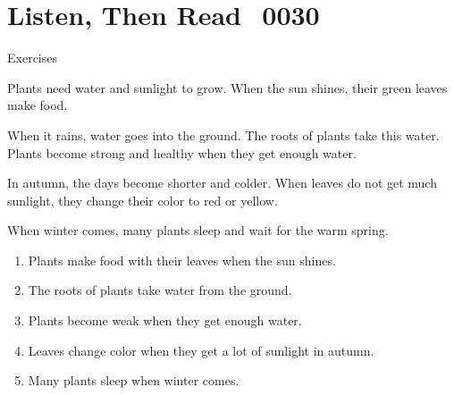 \documentclass[aspectratio=169,xcolor={dvipsnames,table}]{beamer}
\begin{document}
\section{Listen, Then Read\,\,\,\,\,{\tiny 0030}\,{\scriptsize {}}}
\begin{frame}[plain,t]{Exercises}
\vspace*{-6pt}
\begin{tcolorbox}[colframe=ForestGreen,
  colback=NavyBlue!10!white,
  colbacktitle=NavyBlue!40!white,
  coltitle=black, %
before upper={\setlength{\parindent}{1.25em}},
 title={Plants and the Sun\hfill{\tiny 0030}\quad{\scriptsize \myaudio{./audio/021_when_reading.mp3}}}
]
Plants need water and sunlight to grow. When the sun shines, their green leaves make food.

When it rains, water goes into the ground. The roots of plants take this water. Plants become strong and healthy when they get enough water.

In autumn, the days become shorter and colder. When leaves do not get much sunlight, they change their color to red or yellow.

When winter comes, many plants sleep and wait for the warm spring.
\end{tcolorbox}

\vspace{-4pt}
\vspace{-11pt}
\begin{enumerate}\setlength{\itemsep}{-3.2pt}
\item<2-> Plants make food with their leaves when the sun shines.\hfill{}
\item<2-> The roots of plants take water from the ground.\hfill{}
\item<2-> Plants become weak when they get enough water.\hfill{}
\item<2-> Leaves change color when they get a lot of sunlight in autumn.\hfill{}
\item<2-> Many plants sleep when winter comes.\hfill{}
\end{enumerate}
\end{frame}
\end{document}
